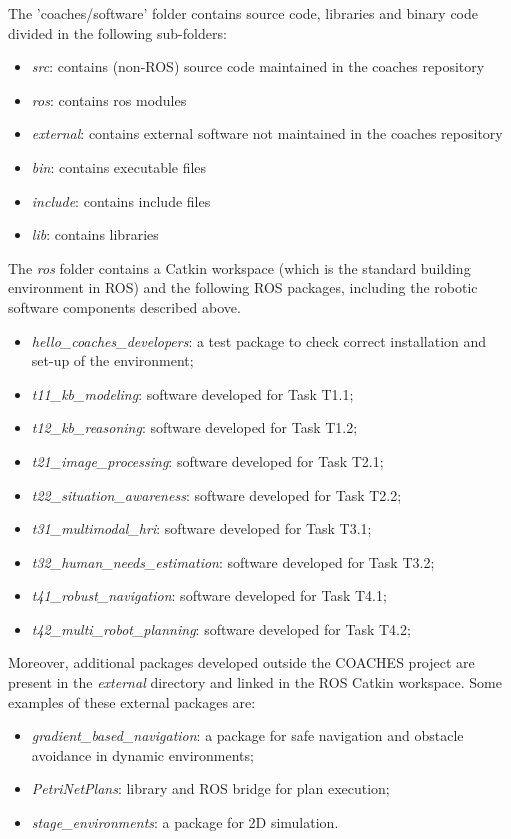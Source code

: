 \documentclass{article}
\begin{document}
The 'coaches/software' folder contains source code, libraries and binary code 
divided in the following sub-folders:

\begin{itemize}
\item \emph{src}:       contains (non-ROS) source code maintained in the coaches repository
\item \emph{ros}:       contains ros modules
\item \emph{external}:  contains external software not maintained in the coaches repository
\item \emph{bin}:       contains executable files
\item \emph{include}:   contains include files 
\item \emph{lib}:       contains libraries
\end{itemize}


The \emph{ros} folder contains a Catkin workspace (which is the standard building environment in ROS) and the following ROS packages, including the robotic software components described above.

\begin{itemize}
\item \emph{hello\_coaches\_developers}: a test package to check correct installation and set-up of the environment;
\item \emph{t11\_kb\_modeling}: software developed for Task T1.1;
\item \emph{t12\_kb\_reasoning}: software developed for Task T1.2;
\item \emph{t21\_image\_processing}: software developed for Task T2.1;
\item \emph{t22\_situation\_awareness}: software developed for Task T2.2;
\item \emph{t31\_multimodal\_hri}: software developed for Task T3.1;
\item \emph{t32\_human\_needs\_estimation}: software developed for Task T3.2;
\item \emph{t41\_robust\_navigation}: software developed for Task T4.1;
\item \emph{t42\_multi\_robot\_planning}: software developed for Task T4.2;
\end{itemize}


Moreover, additional packages developed outside the COACHES project are present in the \emph{external} directory and linked in the ROS Catkin workspace.
Some examples of these external packages are:
\begin{itemize}
\item \emph{gradient\_based\_navigation}: a package for safe navigation and obstacle avoidance in dynamic environments;
\item \emph{PetriNetPlans}: library and ROS bridge for plan execution;
\item \emph{stage\_environments}: a package for 2D simulation.
\end{itemize}
\end{document}
